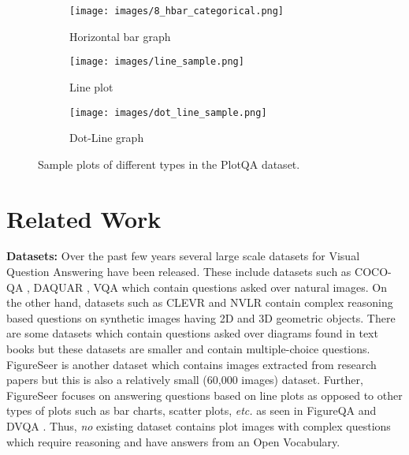 \documentclass[10pt,twocolumn,letterpaper]{article}
\begin{document}
\begin{figure*}
\centering
\begin{subfigure}[t]{.3\textwidth}
  \centering
  \texttt{[image: images/8\_hbar\_categorical.png]}
  \caption{Horizontal bar graph}
  \label{fig:dataset_examples_hbar}
\end{subfigure}
\begin{subfigure}[t]{.3\textwidth}
  \centering
  \texttt{[image: images/line\_sample.png]}
  \caption{Line plot}
  \label{fig:dataset_examples_line}
\end{subfigure}
\begin{subfigure}[t]{.3\textwidth}
  \centering
  \texttt{[image: images/dot\_line\_sample.png]}
  \caption{Dot-Line graph}
  \label{fig:dataset_examples_dotline}
\end{subfigure}
\caption{Sample plots of different types in the PlotQA dataset.}
\label{fig:dataset_examples}
\end{figure*}



\section{Related Work}


\noindent\textbf{Datasets:} 
Over the past few years several large scale datasets for Visual Question Answering have been released. 
These include datasets such as COCO-QA \cite{RenKZ15}, DAQUAR \cite{MalinowskiF14}, VQA \cite{AntolALMBZP15,GoyalKSBP17} which contain questions asked over natural images. 
On the other hand, datasets such as CLEVR \cite{JohnsonHMFZG17} and NVLR \cite{SuhrLYA17} contain complex reasoning based questions on synthetic images having 2D and 3D geometric objects.  
There are some datasets \cite{KembhaviSKSHF16,KembhaviSSCFH17} which contain questions asked over diagrams found in text books but these datasets are smaller and contain multiple-choice questions. 
FigureSeer \cite{SiegelHLDF16} is another dataset which contains images extracted from research papers but this is also a relatively small (60,000 images) dataset. 
Further, FigureSeer focuses on answering questions based on line plots as opposed to other types of plots such as bar charts, scatter plots, \textit{etc.} as seen in FigureQA \cite{FQA} and DVQA  \cite{DVQA}. 
Thus, \emph{no} existing dataset contains plot images with complex questions which require reasoning and have answers from an Open Vocabulary.
\end{document}
